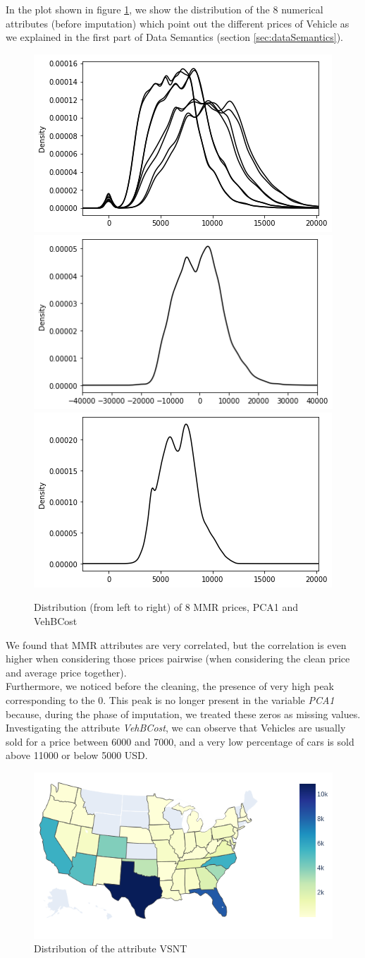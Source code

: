\documentclass{article}
\begin{document}
	In the plot shown in figure \ref{fig:mmr}, we show the distribution of the 8 numerical attributes (before imputation) which point out the different prices of Vehicle as we explained in the first part of Data Semantics (section \ref{sec:dataSemantics}). 
	\begin{figure}[H]
		\centering
		\includegraphics[width=.32\textwidth]{index}\hfill
		\includegraphics[width=.32\textwidth]{PCA1} \hfill
		\includegraphics[width=.32\textwidth]{vehbcostNoTitle}\hfill
		\caption{Distribution (from left to right) of 8 MMR prices, PCA1 and VehBCost}
		\label{fig:mmr}
	\end{figure}
	
	We found that MMR attributes are very correlated, but the correlation is even higher when considering those prices pairwise (when considering the clean price and average price together).\\
	Furthermore, we noticed before the cleaning, the presence of very high peak corresponding to the 0. This peak is no longer present in the variable \emph{PCA1} because, during the phase of imputation, we treated these zeros as missing values. Investigating the attribute \emph{VehBCost}, we can observe that Vehicles are usually sold for a price between 6000 and 7000, and a very low percentage of cars is sold above 11000 or below 5000 USD.
	
	
	
	\begin{figure}[H]
		\centering
		\includegraphics[width=.65\textwidth]{newplot.png}
		\caption{{ Distribution of the attribute VSNT}}
	\end{figure}
	
\end{document}
